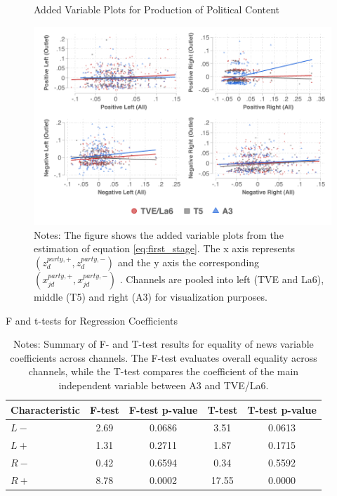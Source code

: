 \documentclass[12pt]{article}
\begin{document}
		\begin{figure}[h!]
		\centering
\caption{Added Variable Plots for Production of Political Content}
		\includegraphics[width=160mm]{figures/fwl_plots}
		\caption*{\small Notes: The figure shows the added variable plots from the estimation of equation \ref{eq:first_stage}. The x axis represents $\left(z_d^{party,+},z_d^{party,-}\right) $ and the y axis the corresponding  $\left(x_{jd}^{party,+},x_{jd}^{party,-}\right) $   . Channels are pooled into left (TVE and La6), middle (T5) and right (A3) for visualization purposes.  }
		\label{fig:fwl}
	\end{figure}
	
	
	
	
	\begin{table}[h!]
		\centering
	

		\caption{F and t-tests for Regression Coefficients}
		\begin{tabular}{lcccc}
			\hline
			Characteristic & F-test  & F-test p-value & T-test  & T-test p-value \\
			\hline
			$ {L-}$& 2.69 & 0.0686 & 3.51  & 0.0613 \\
			$ {L+}$ & 1.31 & 0.2711 & 1.87  & 0.1715 \\
			$ {R-}$ & 0.42 & 0.6594 & 0.34 & 0.5592 \\
$ {R+}$ & 8.78 & 0.0002 & 17.55  & 0.0000 \\
			\hline
		\end{tabular}
			\caption*{\small Notes: Summary of F- and T-test results for equality of news variable coefficients across channels. The F-test evaluates overall equality across channels, while the T-test compares the coefficient of the main independent variable between A3 and TVE/La6.}
					\label{tab:tests}
	\end{table}
	
\end{document}
